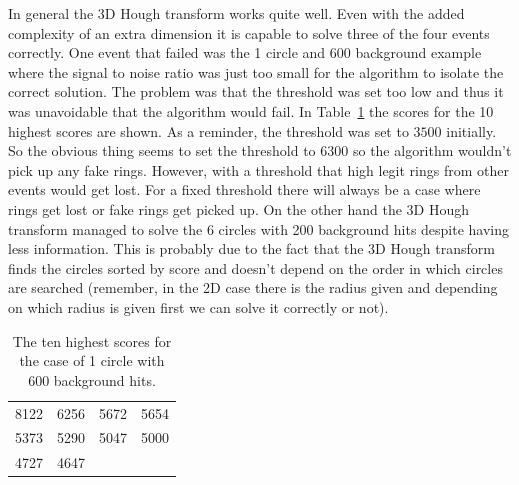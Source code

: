 \documentclass[11pt,twoside]{scrreprt}
\begin{document}
In general the 3D Hough transform works quite well. Even with the added complexity of an extra dimension it is capable to solve three of
the four events correctly. One event that failed was the 1 circle and 600 background example where the signal to noise ratio was just 
too small for the algorithm to isolate the correct solution. The problem was that the threshold was set too low and thus it was unavoidable
that the algorithm would fail. In Table~\ref{tab:3d_10_high_scores} the scores for the 10 highest scores are shown. As a reminder, the threshold
was set to $3500$ initially. So the obvious thing seems to set the threshold to $6300$ so the algorithm wouldn't pick up any fake rings.
However, with a threshold that high legit rings from other events would get lost. For a fixed threshold there will always be a case where rings get
lost or fake rings get picked up. 
On the other hand the 3D Hough transform managed to solve the 6 circles with 200 background hits despite having less information. 
This is probably due to the fact that the 3D Hough transform finds the circles sorted by score and doesn't depend on the order in 
which circles are searched (remember, in the 2D case there is the radius given and depending on which radius is given first we can 
solve it correctly or not).

\begin{table}[ht]
\centering
\caption[Circle scores for 1 circle 600 background hits]{The ten highest scores for the case of 1 circle with 600 background hits.}
\label{tab:3d_10_high_scores}
\begin{tabular}{c|c|c|c}
\toprule
8122 & 6256 & 5672 & 5654 \\
5373 & 5290 & 5047 & 5000 \\
4727 & 4647 &  &  \\
\bottomrule
\end{tabular}
\end{table}
\end{document}
